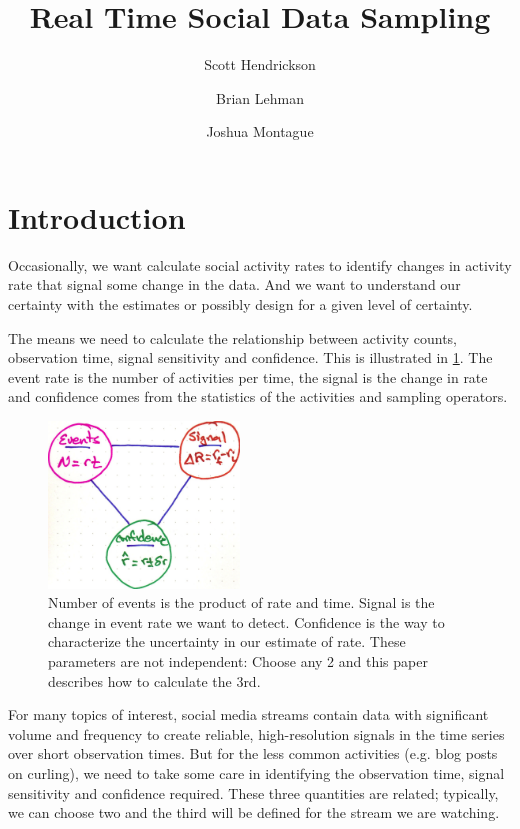 \documentclass{article}
\title{Real Time Social Data Sampling }
\author[]{Scott Hendrickson}
\author[]{Brian Lehman}
\author[]{Joshua Montague}
\affil[]{ \Large{Gnip, Inc.} }
\begin{document}
\maketitle

\section{Introduction}

Occasionally, we want calculate social activity rates to identify changes in activity rate that signal some change in the data.  And we want to
understand our certainty with the estimates or possibly design for a given level of certainty.

The means we need to calculate the relationship between activity counts, observation time, signal sensitivity and confidence. This is illustrated in \ref{fig:tradeoff}. The event rate is the number of activities per time, the signal is the change in rate and confidence comes from the statistics of the activities and sampling operators.

%
\begin{figure}[h]
	\begin{center}
		\includegraphics[width=2.0in]{./imgs/tradeoff.jpg}
	\end{center}
	\caption{Number of events is the product of rate and time. Signal is the change in event rate we want to detect.  Confidence is the way to characterize the
	uncertainty in our estimate of rate.  These parameters are not independent: Choose any 2 and this paper describes how to calculate the 3rd. }
    	\label{fig:tradeoff}
\end{figure}
%
%

For many topics of interest, social media streams contain data with significant volume and frequency to create reliable, high-resolution signals in the time series over short observation times.  But for the less common activities (e.g. blog posts on curling), we need to take some care in identifying the observation time, signal sensitivity and confidence required. These three quantities are related; typically, we can choose two and the third will be defined for the stream we are watching.
\end{document}
